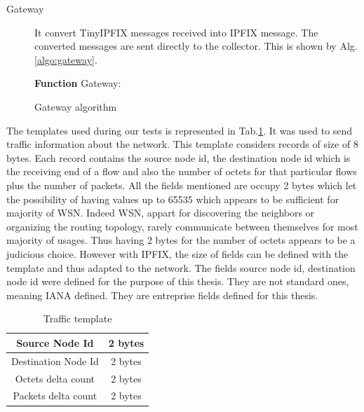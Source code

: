 \begin{description}
  \item[Gateway] It convert TinyIPFIX messages received into IPFIX message. The converted messages are sent directly to the collector. This is shown by Alg.\ref{algo:gateway}.

  \begin{algorithm}
    \textbf{Function} Gateway:\\
   \caption{Gateway algorithm}
   \label{algo:gateway}
  \end{algorithm}

\end{description}

The templates used during our tests is represented in Tab.\ref{table:traffic_template}. It was used to send traffic information about the network. This template considers records of size of 8 bytes. Each record contains the source node id, the destination node id which is the receiving end of a flow and also the number of octets for that particular flows plus the number of packets. All the fields mentioned are occupy 2 bytes which let the possibility of having values up to 65535 which appears to be sufficient for majority of WSN. Indeed WSN, appart for discovering the neighbors or organizing the routing topology, rarely communicate between themselves for most majority of usages. Thus having 2 bytes for the number of octets appears to be a judicious choice. However with IPFIX, the size of fields can be defined with the template and thus adapted to the network. The fields source node id, destination node id were defined for the purpose of this thesis. They are not standard ones, meaning IANA defined. They are entreprise fields defined for this thesis.

\begin{table}
  \centering
  \begin{tabular}{|c|c|}
    \hline
    Source Node Id & 2 bytes \\
    \hline
    Destination Node Id & 2 bytes \\
    \hline
    Octets delta count & 2 bytes \\
    \hline
    Packets delta count & 2 bytes \\
    \hline
  \end{tabular}
  \caption{Traffic template}
  \label{table:traffic_template}
\end{table}

